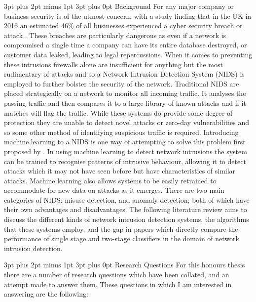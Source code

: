 \documentclass[12pt,a4paper]{article}
\makeatletter
\renewcommand\subsection{\@startsection {subsection}{1}{2mm} %
      {3pt plus 2pt minus 1pt} %
      {3pt plus 0pt} %
      {\normalfont\bfseries}}
\makeatother
\begin{document}
\subsection{Background}
	For any major company or business security is of the utmost concern, with a study finding that in the UK in 2016 an estimated 46\% of all businesses experienced a cyber security breach or attack \parencite{securitysurvey2017}. These breaches are particularly dangerous as even if a network is compromised a single time a company can have its entire database destroyed, or customer data leaked, leading to legal repercussions. When it comes to preventing these intrusions firewalls alone are insufficient for anything but the most rudimentary of attacks and so a Network Intrusion Detection System (NIDS) is employed to further bolster the security of the network. Traditional NIDS are placed strategically on a network to monitor all incoming traffic. It analyses the passing traffic and then compares it to a large library of known attacks and if it matches will flag the traffic. While these systems do provide some degree of protection they are unable to detect novel attacks or zero-day vulnerabilities and so some other method of identifying suspicious traffic is required. Introducing machine learning to a NIDS is one way of attempting to solve this problem first proposed by \cite{denning1987intrusion}. In using machine learning to detect network intrusions the system can be trained to recognise patterns of intrusive behaviour, allowing it to detect attacks which it may not have seen before but have characteristics of similar attacks. Machine learning also allows systems to be easily retrained to accommodate for new data on attacks as it emerges. There are two main categories of NIDS: misuse detection, and anomaly detection; both of which have their own advantages and disadvantages. The following literature review aims to discuss the different kinds of network intrusion detection systems, the algorithms that these systems employ, and the gap in papers which directly compare the performance of single stage and two-stage classifiers in the domain of network intrusion detection.
		
\subsection{Research Questions}
	For this honours thesis there are a number of research questions which have been collated, and an attempt made to answer them. These questions in which I am interested in answering are the following: 
		
\end{document}
